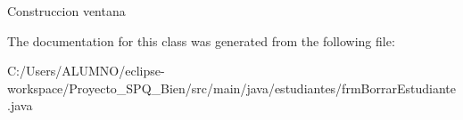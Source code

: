 Construccion ventana 

The documentation for this class was generated from the following file\+:\begin{DoxyCompactItemize}
\item 
C\+:/\+Users/\+A\+L\+U\+M\+N\+O/eclipse-\/workspace/\+Proyecto\+\_\+\+S\+P\+Q\+\_\+Bien/src/main/java/estudiantes/frm\+Borrar\+Estudiante.\+java\end{DoxyCompactItemize}
